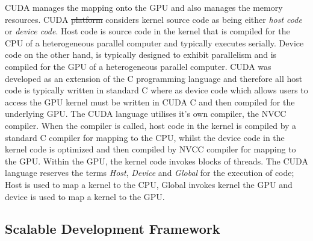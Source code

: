 \documentclass[10pt]{article}[draft]
\begin{document}
 CUDA manages the mapping onto the GPU and also manages the memory resources. CUDA \st{platform} considers kernel source code  as being either \emph{host code} or \emph{device code}. Host code is source code in the kernel that is compiled for the CPU of a heterogeneous parallel computer and typically executes serially. Device code on the other hand, is typically designed to exhibit parallelism and is compiled for the GPU of a heterogeneous parallel computer. CUDA was developed as an extension of the C programming language and therefore all host code is typically written in standard C where as device code which allows users to access the GPU kernel must be written in CUDA C and then compiled for the underlying GPU. The CUDA language utilises it's own compiler, the NVCC compiler.  When the compiler is called, host code in the kernel is compiled  by a standard C compiler for mapping to the CPU, whilst the device code in the kernel code is optimized and then compiled by NVCC compiler for mapping to the GPU. Within the GPU, the kernel code invokes blocks of threads.  The CUDA language reserves the terms \emph{Host}, \emph{Device} and \emph{Global} for the execution of code; Host is used to map a kernel to the CPU, Global invokes kernel the GPU and device is used to map a kernel to the GPU.

\subsection{Scalable Development Framework}
\end{document}
